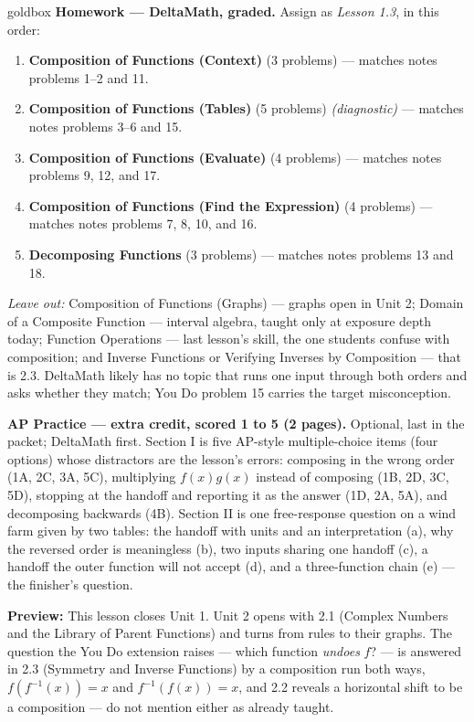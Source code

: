 \documentclass[10pt]{article}
\begin{document}
\begin{skillbox}{goldbox}
\textbf{Homework --- DeltaMath, graded.} Assign as \textit{Lesson 1.3}, in this order:
\begin{enumerate}[itemsep=1pt,topsep=2pt]
  \item \textbf{Composition of Functions (Context)} (3 problems) --- matches notes problems 1--2
        and 11.
  \item \textbf{Composition of Functions (Tables)} (5 problems) \textit{(diagnostic)} ---
        matches notes problems 3--6 and 15.
  \item \textbf{Composition of Functions (Evaluate)} (4 problems) --- matches notes problems 9,
        12, and 17.
  \item \textbf{Composition of Functions (Find the Expression)} (4 problems) --- matches notes
        problems 7, 8, 10, and 16.
  \item \textbf{Decomposing Functions} (3 problems) --- matches notes problems 13 and 18.
\end{enumerate}
\textit{Leave out:} Composition of Functions (Graphs) --- graphs open in Unit 2; Domain of a
Composite Function --- interval algebra, taught only at exposure depth today; Function Operations
--- last lesson's skill, the one students confuse with composition; and Inverse Functions or
Verifying Inverses by Composition --- that is 2.3. DeltaMath likely has no topic that runs one
input through both orders and asks whether they match; You Do problem 15 carries the target
misconception.

\textbf{AP Practice --- extra credit, scored 1 to 5 (2 pages).} Optional, last in the packet; DeltaMath first.
Section I is five AP-style multiple-choice items (four options) whose distractors are the lesson's
errors: composing in the wrong order (1A, 2C, 3A, 5C), multiplying $f(x)g(x)$ instead of composing
(1B, 2D, 3C, 5D), stopping at the handoff and reporting it as the answer (1D, 2A, 5A), and
decomposing backwards (4B). Section II is one free-response question on a wind farm given by two
tables: the handoff with units and an interpretation (a), why the reversed order is meaningless
(b), two inputs sharing one handoff (c), a handoff the outer function will not accept (d), and a
three-function chain (e) --- the finisher's question.

\textbf{Preview:} This lesson closes Unit 1. Unit 2 opens with 2.1 (Complex Numbers and the
Library of Parent Functions) and turns from rules to their graphs. The question the You Do
extension raises --- which function \emph{undoes} $f$? --- is answered in 2.3 (Symmetry and
Inverse Functions) by a composition run both ways, $f(f^{-1}(x)) = x$ and $f^{-1}(f(x)) = x$, and
2.2 reveals a horizontal shift to be a composition --- do not mention either as already taught.
\end{skillbox}
\end{document}
